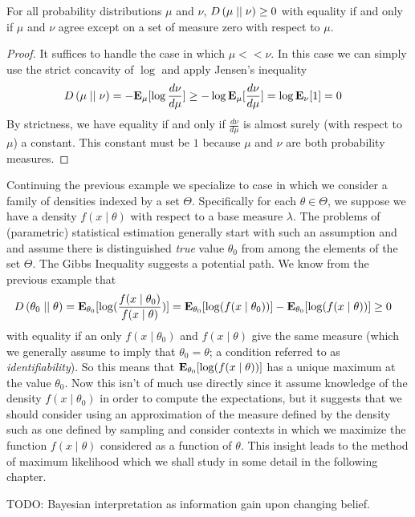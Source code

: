 \begin{lem}\label{GibbsInequality}For all
  probability distributions $\mu$ and $\nu$, $\kldiv{\mu}{\nu} \geq 0$
  with equality if and only if $\mu$ and $\nu$ agree except on a set
  of measure zero with respect to $\mu$.
\end{lem}
\begin{proof}
It suffices to handle the case in which $\mu << \nu$.  In this case we
can simply use the strict concavity of $\log$ and apply Jensen's inequality
\begin{align*}
\kldiv{\mu}{\nu} &= -\sexpectation{\log \frac{d\nu}{d\mu}}{\mu} \geq
-\log \sexpectation{\frac{d\nu}{d\mu}}{\mu} = \log
\sexpectation{1}{\nu} = 0
\end{align*}
By strictness, we have equality if and only if $\frac{d\nu}{d\mu}$ is
almost surely (with respect to $\mu$) a constant.  This constant must be $1$ because $\mu$ and
$\nu$ are both probability measures.  
\end{proof}

\begin{examp}Continuing the previous example we specialize to case in
  which we consider a family of densities indexed by a set $\Theta$.
  Specifically for each $\theta \in \Theta$, we suppose we have a
  density $f(x \mid \theta)$ with respect to a base measure
  $\lambda$.  The problems of (parametric) statistical estimation generally start
  with such an assumption and and assume there is distinguished
  \emph{true} value $\theta_0$ from among the elements of the set
  $\Theta$.  The Gibbs Inequality suggests a potential path.  We know
  from the previous example that 
\begin{align*}
\kldiv{\theta_0}{\theta} &= \sexpectation{ \log( \frac{f(x \mid \theta_0)}{f(x
  \mid \theta)})}{\theta_0} = \sexpectation{ \log( f(x \mid \theta_0))
}{\theta_0} - \sexpectation{ \log( f(x \mid \theta))
}{\theta_0} \geq 0
\end{align*}
with equality if an only $f(x \mid \theta_0)$ and $f(x \mid \theta)$
give the same measure (which we generally assume to imply that
$\theta_0 = \theta$; a condition referred to as
\emph{identifiability}).  So this means that $\sexpectation{ \log( f(x \mid \theta))
}{\theta_0}$ has a unique maximum at the value $\theta_0$.  Now this
isn't of much use directly since it assume knowledge of the density
$f(x \mid \theta_0)$ in order to compute the expectations, but it
suggests that we should consider using an approximation of the measure
defined by the density such as one defined by sampling and consider
contexts in which we maximize the function $f(x \mid \theta)$
considered as a function of $\theta$.  This insight leads to the
method of maximum likelihood which we shall study in some detail in
the following chapter.
\end{examp}
TODO: Bayesian interpretation as information gain upon changing
belief.

